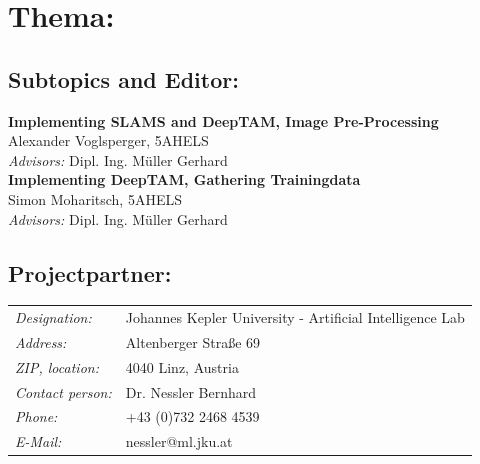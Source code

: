 

\chapter*{Thema: \newline \htlArbeitsthema }



\section*{Subtopics and Editor:}


\textbf{Implementing SLAMS and DeepTAM, Image Pre-Processing}\\ 
Alexander Voglsperger, 5AHELS\\
\emph{Advisors:} Dipl. Ing. Müller Gerhard\\[2ex] 
%
\textbf{Implementing DeepTAM, Gathering Trainingdata}\\ 
Simon Moharitsch, 5AHELS\\
\emph{Advisors:} Dipl. Ing. Müller Gerhard\\[2ex]



\section*{Projectpartner:}

\renewcommand{\arraystretch}{1.5}
\begin{tabularx}{1\textwidth}{@{} l X @{}}

\emph{Designation:} & Johannes Kepler University - Artificial Intelligence Lab\\
\emph{Address:} & Altenberger Straße 69\\
\emph{ZIP, location:} & 4040 Linz, Austria\\
\emph{Contact person:} & Dr. Nessler Bernhard\\
\emph{Phone:} & +43 (0)732 2468 4539\\
\emph{E-Mail:} & nessler@ml.jku.at\\

\end{tabularx}


